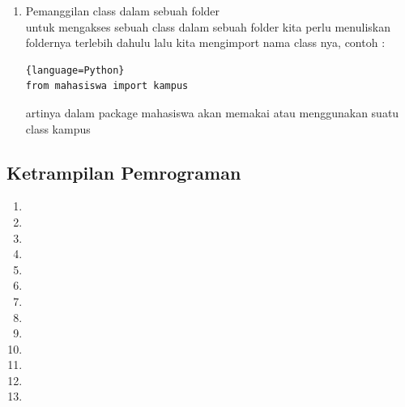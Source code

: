 \documentclass[a4paper, 12pt]{article}
\begin{document}
\begin{enumerate}
			\item Pemanggilan class dalam sebuah folder\\
			untuk mengakses sebuah class dalam sebuah folder kita perlu menuliskan foldernya terlebih dahulu lalu kita  mengimport nama class nya, contoh :
			\begin{lstlisting}{language=Python}
from mahasiswa import kampus
			\end{lstlisting}
artinya dalam package mahasiswa akan memakai atau menggunakan suatu class kampus
			
			\end{enumerate}

    \newpage			
	\subsection{Ketrampilan Pemrograman}
			\begin{enumerate}
				\item 
				\newpage \item 
				\item 
				\item 
				\item 
				\item 
				\item 
				\item 
				\item 
				\item 
				\item 
				\item 
				\item 
	
\end{enumerate}
\end{document}
